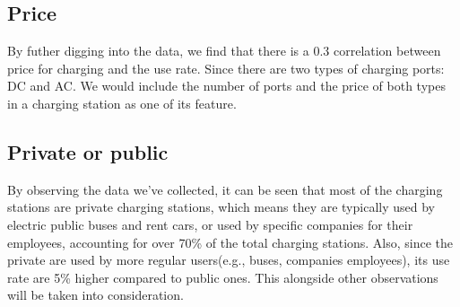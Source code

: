 \subsection{Price}
By futher digging into the data, we find that there is a 0.3 correlation between price for charging and the use rate. Since there are two types of charging ports: DC and AC. We would include the number of ports and the price of both types in a charging station as one of its feature.

\subsection{Private or public}
By observing the data we've collected, it can be seen that most of the charging stations are private charging stations, which means they are typically used by electric public buses and rent cars, or used by specific companies for their employees, accounting for over 70\% of the total charging stations. Also, since the private are used by more regular users(e.g., buses, companies employees), its use rate are 5\% higher compared to public ones. This alongside other observations will be taken into consideration.
